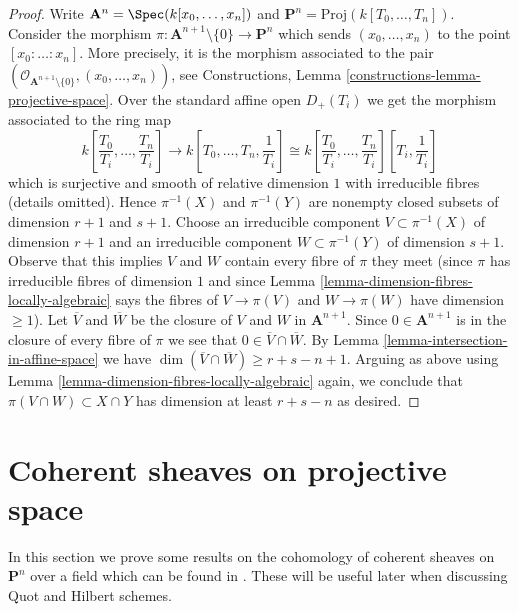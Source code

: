 \begin{proof}
Write $\mathbf{A}^n = \Spec(k[x_0, \ldots, x_n])$ and
$\mathbf{P}^n = \text{Proj}(k[T_0, \ldots, T_n])$.
Consider the morphism
$\pi : \mathbf{A}^{n + 1} \setminus \{0\} \to \mathbf{P}^n$
which sends $(x_0, \ldots, x_n)$ to the point $[x_0 : \ldots : x_n]$.
More precisely, it is the morphism associated to the pair
$(\mathcal{O}_{\mathbf{A}^{n + 1} \setminus \{0\}}, (x_0, \ldots, x_n))$,
see Constructions, Lemma \ref{constructions-lemma-projective-space}.
Over the standard affine open $D_+(T_i)$ we get the morphism
associated to the ring map
$$
k\left[\frac{T_0}{T_i}, \ldots, \frac{T_n}{T_i}\right]
\longrightarrow
k\left[T_0, \ldots, T_n, \frac{1}{T_i}\right] \cong
k\left[\frac{T_0}{T_i}, \ldots, \frac{T_n}{T_i}\right]
\left[T_i, \frac{1}{T_i}\right]
$$
which is surjective and smooth of relative dimension $1$
with irreducible fibres (details omitted).
Hence $\pi^{-1}(X)$ and $\pi^{-1}(Y)$ are nonempty closed subsets of
dimension $r + 1$ and $s + 1$. Choose an irreducible component
$V \subset \pi^{-1}(X)$ of dimension $r + 1$ and an
irreducible component $W \subset \pi^{-1}(Y)$ of dimension $s + 1$.
Observe that this implies $V$ and $W$ contain every fibre of $\pi$
they meet (since $\pi$ has irreducible fibres of dimension $1$
and since Lemma \ref{lemma-dimension-fibres-locally-algebraic}
says the fibres of $V \to \pi(V)$ and $W \to \pi(W)$ have dimension $\geq 1$).
Let $\overline{V}$ and $\overline{W}$ be the closure of
$V$ and $W$ in $\mathbf{A}^{n + 1}$. Since $0 \in \mathbf{A}^{n + 1}$
is in the closure of every fibre of $\pi$ we see that
$0 \in \overline{V} \cap \overline{W}$. By
Lemma \ref{lemma-intersection-in-affine-space}
we have $\dim(\overline{V} \cap \overline{W}) \geq r + s - n + 1$.
Arguing as above using Lemma \ref{lemma-dimension-fibres-locally-algebraic}
again, we conclude that $\pi(V \cap W) \subset X \cap Y$
has dimension at least $r + s - n$ as desired.
\end{proof}





\section{Coherent sheaves on projective space}
\label{section-coherent-Pn}

\noindent
In this section we prove some results on the cohomology of coherent
sheaves on $\mathbf{P}^n$ over a field which can be found in
\cite{Mum}. These will be useful later
when discussing Quot and Hilbert schemes.

